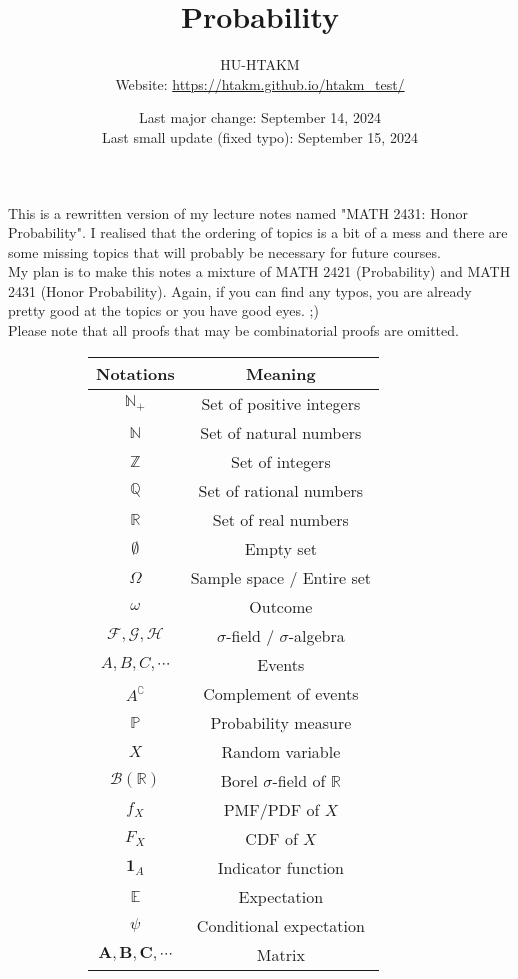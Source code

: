 \documentclass{huhtakm-template-book}
\title{Probability}
\author{
	HU-HTAKM\\
	Website: \url{https://htakm.github.io/htakm_test/}
}
\date{
	Last major change: September 14, 2024\\
	Last small update (fixed typo): September 15, 2024
}
\newcommand{\prob}{\mathbb{P}}
\begin{document}
\maketitle
This is a rewritten version of my lecture notes named "MATH 2431: Honor Probability". I realised that the ordering of topics is a bit of a mess and there are some missing topics that will probably be necessary for future courses.\\
My plan is to make this notes a mixture of MATH 2421 (Probability) and MATH 2431 (Honor Probability). Again, if you can find any typos, you are already pretty good at the topics or you have good eyes. ;)\\
Please note that all proofs that may be combinatorial proofs are omitted.
\begin{figure}[h]
	\begin{subfigure}{0.45\textwidth}
		\centering
		\begin{tabular}{cc}
			Notations & Meaning\\
			\hline
			$\mathbb{N}_{+}$ & Set of positive integers\\
			$\mathbb{N}$ & Set of natural numbers\\
			$\mathbb{Z}$ & Set of integers\\
			$\mathbb{Q}$ & Set of rational numbers\\
			$\mathbb{R}$ & Set of real numbers\\
			$\emptyset$ & Empty set\\
			$\Omega$ & Sample space / Entire set\\
			$\omega$ & Outcome\\
			$\mathcal{F},\mathcal{G},\mathcal{H}$ & $\sigma$-field / $\sigma$-algebra\\
			$A,B,C,\cdots$ & Events\\
			$A^{\complement}$ & Complement of events\\
			$\prob$ & Probability measure\\
			$X$ & Random variable\\
			$\mathcal{B}(\mathbb{R})$ & Borel $\sigma$-field of $\mathbb{R}$ \\
			$f_{X}$ & PMF/PDF of $X$\\
			$F_{X}$ & CDF of $X$\\
			$\mathbf{1}_{A}$ & Indicator function\\
			$\mathbb{E}$ & Expectation\\
			$\psi$ & Conditional expectation\\
			$\mathbf{A},\mathbf{B},\mathbf{C},\cdots$ & Matrix\\

\end{tabular}
\end{subfigure}
\end{figure}
\end{document}

